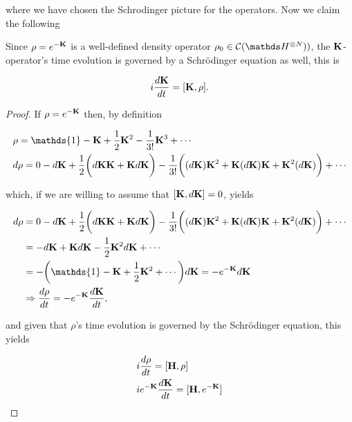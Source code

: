 \documentclass{homework}
\begin{document}
where we have chosen the Schrodinger picture for the operators. Now we claim the following 

\begin{theo}
    Since $\rho = e^{-{\bf K}}$ is a well-defined density operator $\rho_0 \in \mathcal{C}(\hilbert^{\otimes N}))$, the ${\bf K}$-operator's time evolution is governed by a Schr\"odinger equation as well, this is 
    
    $$
        i \frac{d{\bf K}}{dt} =  [{\bf K}, \rho].
    $$
\end{theo}

\begin{proof}
    If $\rho = e^{-{\bf K}}$ then, by definition 
    
    \begin{equation}
    \begin{split}
            &\rho = \mathds{1} - {\bf K} + \frac{1}{2}{\bf K}^2 - \frac{1}{3!} {\bf K}^3 + \cdots \\
            &d\rho = 0 - d{\bf K} + \frac{1}{2} \bigg(d{\bf K} {\bf K} + {\bf K} d{\bf K} \bigg) - \frac{1}{3!} \bigg((d{\bf K}) {\bf K}^2 + {\bf K} (d{\bf K}) {\bf K} + {\bf K}^2 (d{\bf K}) \bigg) + \cdots 
    \end{split}
    \end{equation}
    
    which, if we are willing to assume that $[{\bf K},d{\bf K}] = 0$, yields 
    
    \begin{equation}
    \begin{split}
        d\rho &= 0 - d{\bf K} + \frac{1}{2} \bigg(d{\bf K} {\bf K} + {\bf K} d{\bf K} \bigg) - \frac{1}{3!} \bigg((d{\bf K}) {\bf K}^2 + {\bf K} (d{\bf K}) {\bf K} + {\bf K}^2 (d{\bf K}) \bigg) + \cdots \\
        &= - d{\bf K} + {\bf K}d{\bf K} - \frac{1}{2} {\bf K}^2 d{\bf K} + \cdots \\
        &= -\bigg( \mathds{1} - {\bf K} + \frac{1}{2} {\bf K}^2 + \cdots\bigg) d{\bf K} = -e^{-{\bf K}} d{\bf K} \\
        &\Rightarrow \frac{d\rho}{dt} = -e^{-{\bf K}} \frac{d{\bf K}}{dt},
    \end{split}
    \end{equation}
    
    and given that $\rho$'s time evolution is governed by the Schr\"odinger equation, this yields
    
    \begin{equation}
        \begin{split}
            &i\frac{d\rho}{dt} = [{\bf H}, \rho] \\
            & i e^{-{\bf K}} \frac{d{\bf K}}{dt}  = [{\bf H}, e^{-{\bf K}}]
        \end{split}
    \end{equation}
    

\end{proof}
\end{document}
